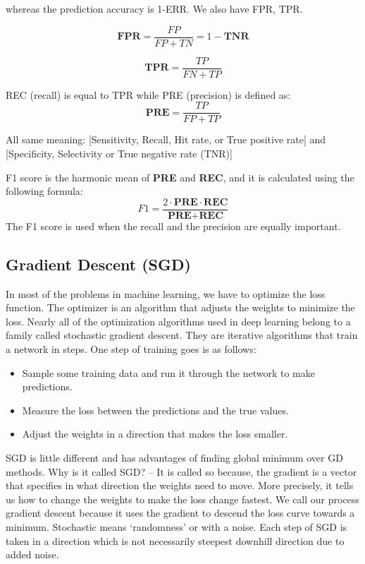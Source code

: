 \documentclass[11pt]{article}
\begin{document}
whereas the prediction accuracy is 1-ERR. We also have FPR, TPR. 

\begin{equation}
\textbf{FPR} = \frac{FP}{FP+TN}  = 1 - \textbf{TNR} 
\end{equation}

\begin{equation}
\textbf{TPR} = \frac{TP}{FN+TP} 
\end{equation}

REC (recall) is equal to TPR while PRE (precision) is defined as:
\begin{equation}
\textbf{PRE} = \frac{TP}{FP+TP} 
\end{equation}

All same meaning: [Sensitivity, Recall, Hit rate, or True positive rate] and [Specificity, Selectivity or True negative rate (TNR)]


F1 score is the harmonic mean of \textbf{PRE} and \textbf{REC}, and it is calculated 
using the following formula: 
\[ F1 = \frac{2 \cdot \textbf{PRE} \cdot \textbf{REC}}{\textbf{PRE} + \textbf{REC}}\] 
The F1 score is used when the recall and the precision are equally important.




\subsection{Gradient Descent (SGD)} 


In most of the problems in machine learning, we have to optimize the loss function. 
The optimizer is an algorithm that adjusts the weights to minimize the loss. Nearly 
all of the optimization algorithms used in deep learning belong to a family called 
stochastic gradient descent. They are iterative algorithms that train a network in steps. 
One step of training goes is as follows:

\begin{itemize}
\item Sample some training data and run it through the network to make predictions.
\item Measure the loss between the predictions and the true values.
\item Adjust the weights in a direction that makes the loss smaller. 
\end{itemize} 

SGD is little different and has advantages of finding global minimum 
over GD methods. Why is it called SGD? -- 
It is called so because, the gradient is a vector that specifies in what direction the weights need to move. 
More precisely, it tells us how to change the weights to make the loss change fastest. We call our process 
gradient descent because it uses the gradient to descend the loss curve towards a minimum. Stochastic means 
`randomness' or with a noise. Each step of SGD is taken in a direction which is not 
necessarily steepest downhill direction due to added noise. 
\end{document}
